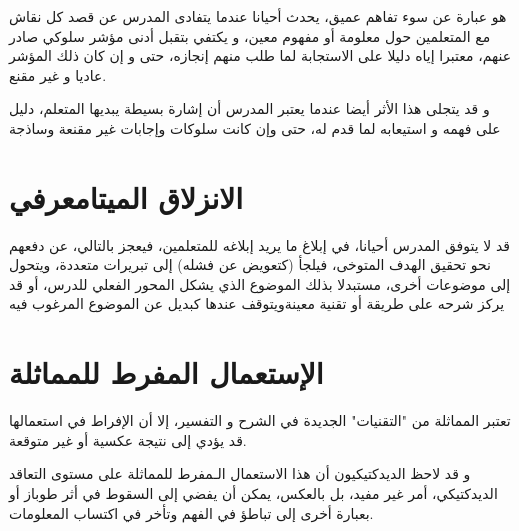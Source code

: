 \documentclass[16pt]{beamer}
\begin{document}
\begin{frame}{}

\begin{block}{}
 هو عبارة عن سوء تفاهم عميق، يحدث أحيانا عندما يتفادى المدرس عن قصد كل نقاش مع المتعلمين حول معلومة أو مفهوم معين، و يكتفي بتقبل أدنى مؤشر سلوكي صادر عنهم، معتبرا إياه دليلا على الاستجابة لما طلب منهم إنجازه، حتى و إن كان ذلك المؤشر عاديا و غير مقنع.
\end{block}
\pause
\begin{block}{}
 و قد يتجلى هذا الأثر أيضا عندما يعتبر المدرس أن إشارة بسيطة يبديها المتعلم، دليل على فهمه و استيعابه لما قدم له، حتى وإن كانت سلوكات وإجابات غير مقنعة وساذجة
\end{block}
\end{frame}

\section{الانزلاق الميتامعرفي}

\begin{frame}{}

\begin{block}{}
قد لا يتوفق المدرس أحيانا، في إبلاغ ما يريد إبلاغه للمتعلمين، فيعجز بالتالي، عن دفعهم نحو تحقيق الهدف المتوخى، فيلجأ (كتعويض عن فشله) إلى تبريرات متعددة، ويتحول إلى موضوعات أخرى، مستبدلا بذلك الموضوع الذي يشكل المحور الفعلي للدرس، أو قد يركز شرحه على طريقة أو تقنية معينةويتوقف عندها كبديل عن الموضوع المرغوب فيه
\end{block}
\end{frame}
\section{ الإستعمال المفرط للمماثلة}
\begin{frame}{}
\begin{block}{}
  تعتبر المماثلة من "التقنيات" الجديدة في الشرح و التفسير، إلا أن الإفراط في استعمالها قد يؤدي إلى نتيجة عكسية أو غير متوقعة.
  \end{block}
  \pause
\begin{block}{}
   و قد لاحظ الديدكتيكيون أن هذا الاستعمال الـمفرط للمماثلة على مستوى التعاقد الديدكتيكي، أمر غير مفيد، بل بالعكس، يمكن أن يفضي إلى السقوط في  أثر طوباز أو بعبارة أخرى إلى تباطؤ في الفهم وتأخر في اكتساب المعلومات.
\end{block}
\end{frame}



%
%
%
\end{document}
